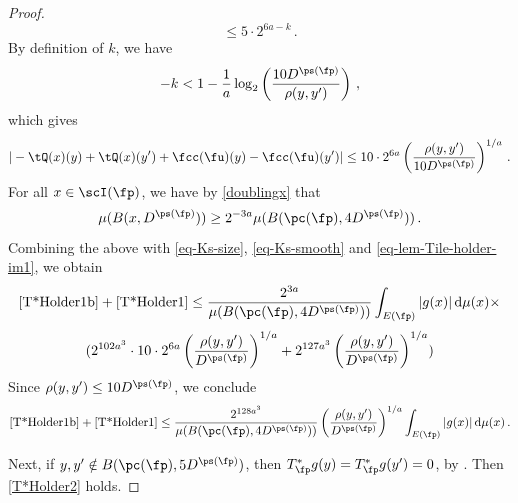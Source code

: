 \begin{proof}
        $$
            \le 5 \cdot 2^{6a - k}\,.
        $$
        By definition of $k$, we have
        $$
            -k < 1 - \frac{1}{a} \log_2\left(\frac{10 D^{\ps(\fp)}}{\rho(y,y')}\right)\,,
        $$
        which gives
      \begin{equation}
            \label{eq-lem-Tile-holder-im1}
             |-\tQ(x)(y) + \tQ(x)(y') + \fcc(\fu)(y) - \fcc(\fu)(y')| \le 10 \cdot 2^{6a} \left(\frac{\rho(y,y')}{10 D^{\ps(\fp)}}\right)^{1/a}\,.
        \end{equation}
        For all $x \in \scI(\fp)$, we have by \eqref{doublingx} that
        $$
            \mu(B(x, D^{\ps(\fp)})) \ge 2^{-3a} \mu(B(\pc(\fp), 4D^{\ps(\fp)}))\,.
        $$
        Combining the above with \eqref{eq-Ks-size}, \eqref{eq-Ks-smooth} and \eqref{eq-lem-Tile-holder-im1},
        we obtain
        $$
            \eqref{T*Holder1b}+\eqref{T*Holder1} \le \frac{2^{3a}}{\mu(B(\pc(\fp), 4D^{\ps(\fp)}))} \int_{E(\fp)}|g(x)| \, \mathrm{d}\mu(x) \times
        $$
        $$
            (2^{102a^3} \cdot 10 \cdot 2^{6a} \left(\frac{\rho(y,y')}{ D^{\ps(\fp)}}\right)^{1/a} + 2^{127a^3} \left(\frac{\rho(y,y')}{D^{\ps(\fp)}}\right)^{1/a})
        $$
        Since $\rho(y,y') \le 10 D^{\ps(\fp)}$, we conclude
        $$
            \eqref{T*Holder1b}+\eqref{T*Holder1} \le \frac{2^{128a^3}}{\mu(B(\pc(\fp), 4D^{\ps(\fp)}))} \left(\frac{\rho(y,y')}{D^{\ps(\fp)}}\right)^{1/a} \int_{E(\fp)}|g(x)| \, \mathrm{d}\mu(x)\,.
        $$

        Next, if $y,y' \notin B(\pc(\fp), 5D^{\ps(\fp)})$, then $T_{\fp}^*g(y) = T_{\fp}^*g(y') = 0$, by . Then \eqref{T*Holder2} holds.


\end{proof}
